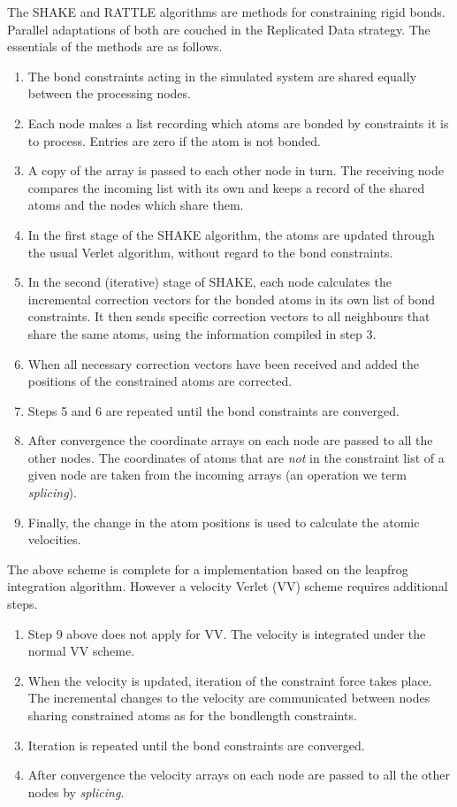 The SHAKE and RATTLE
algorithms are methods for constraining rigid bonds. Parallel
adaptations of both are couched in the Replicated
Data strategy. The essentials of the methods are as follows.

\begin{enumerate}
\item The  bond constraints acting in the simulated system are shared
equally between the processing nodes.
\item Each node makes a list recording which atoms are bonded by 
constraints it is to process. Entries are zero if the atom is not
bonded.
\item A copy of the array is passed to each other node in turn. 
The receiving node compares the incoming list with its own and keeps a
record of the shared atoms and the nodes which share them.
\item In the first stage of the SHAKE algorithm, the atoms are
updated through the usual Verlet algorithm, without regard to the bond
constraints.
\item In the second (iterative) stage of SHAKE, each node calculates
the incremental correction vectors for the bonded atoms in its own list
of bond constraints. It then sends specific correction vectors to all
neighbours that share the same atoms, using the information compiled
in step 3.
\item When all necessary  correction vectors have been received and
added
the positions of the constrained atoms are corrected.
\item Steps 5 and 6 are repeated until the bond constraints are
converged.
\item After convergence the coordinate arrays on each node are 
passed to all the other nodes. The coordinates of atoms that are {\em
not} in the constraint list of a given node are taken from the
incoming
arrays (an operation we term {\em splicing}).
\item Finally, the change in the atom positions is used to calculate
the
atomic velocities.
\end{enumerate}

The above scheme is complete for a implementation based on the
leapfrog integration algorithm. However a velocity Verlet (VV) scheme
requires additional steps.

\begin{enumerate}
\item Step 9 above does not apply for VV. The velocity is integrated
under the normal VV scheme.
\item When the velocity is updated, iteration of the constraint force
takes place. The incremental changes to the velocity are communicated
between nodes sharing constrained atoms as for the bondlength
constraints.
\item Iteration is repeated until the bond constraints are
converged.
\item After convergence the velocity arrays on each node are 
passed to all the other nodes by {\em splicing}.
\end{enumerate}

